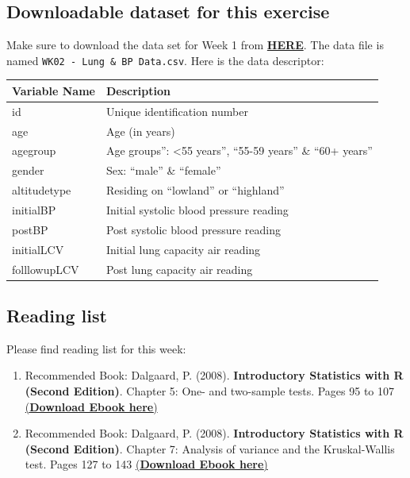 \documentclass[
]{book}
\begin{document}
\hypertarget{downloadable-dataset-for-this-exercise-1}{%
\subsection{Downloadable dataset for this exercise}\label{downloadable-dataset-for-this-exercise-1}}

Make sure to download the data set for Week 1 from \href{https://github.com/UCLPG-MSC-SGDS/GEOG0125/raw/main/Dataset.zip}{\textbf{HERE}}. The data file is named \texttt{WK02\ -\ Lung\ \&\ BP\ Data.csv}. Here is the data descriptor:

\begin{longtable}[]{@{}ll@{}}
\toprule
\textbf{Variable Name} & \textbf{Description} \\
\midrule
\endhead
id & Unique identification number \\
age & Age (in years) \\
agegroup & Age groups'': \textless55 years'', ``55-59 years'' \& ``60+ years'' \\
gender & Sex: ``male'' \& ``female'' \\
altitudetype & Residing on ``lowland'' or ``highland'' \\
initialBP & Initial systolic blood pressure reading \\
postBP & Post systolic blood pressure reading \\
initialLCV & Initial lung capacity air reading \\
folllowupLCV & Post lung capacity air reading \\
\bottomrule
\end{longtable}

\hypertarget{reading-list-1}{%
\subsection{Reading list}\label{reading-list-1}}

Please find reading list for this week:

\begin{enumerate}
\def\labelenumi{\arabic{enumi}.}
\item
  Recommended Book: Dalgaard, P. (2008). \textbf{Introductory Statistics with R (Second Edition)}. Chapter 5: One- and two-sample tests. Pages 95 to 107 \href{https://link.springer.com/book/10.1007/978-0-387-79054-1}{(\textbf{Download Ebook here})}
\item
  Recommended Book: Dalgaard, P. (2008). \textbf{Introductory Statistics with R (Second Edition)}. Chapter 7: Analysis of variance and the Kruskal-Wallis test. Pages 127 to 143 \href{https://link.springer.com/book/10.1007/978-0-387-79054-1}{(\textbf{Download Ebook here})}
\end{enumerate}
\end{document}
